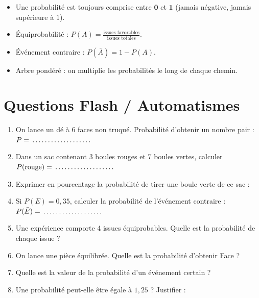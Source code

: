 \begin{cadreretenu}
\begin{itemize}[leftmargin=1.5em, itemsep=2pt]
    \item Une probabilité est toujours comprise entre $\mathbf{0}$ et $\mathbf{1}$ (jamais négative, jamais supérieure à $1$).
    \item Équiprobabilité : $P(A) = \frac{\text{issues favorables}}{\text{issues totales}}$.
    \item Événement contraire : $P(\bar{A}) = 1 - P(A)$.
    \item Arbre pondéré : on multiplie les probabilités le long de chaque chemin.
\end{itemize}
\end{cadreretenu}

\newpage

\section{Questions Flash / Automatismes}

\begin{automatisme}
\begin{enumerate}[label=\textbf{Q\arabic*.}]
    \item On lance un dé à 6 faces non truqué. Probabilité d'obtenir un nombre pair : $P = \pointille[3cm]$
    \item Dans un sac contenant 3 boules rouges et 7 boules vertes, calculer $P(\text{rouge}) = \pointille[3cm]$
    \item Exprimer en pourcentage la probabilité de tirer une boule verte de ce sac : \pointille[3cm]
    \item Si $P(E) = 0{,}35$, calculer la probabilité de l'événement contraire : $P(\bar{E}) = \pointille[3cm]$
    \item Une expérience comporte 4 issues équiprobables. Quelle est la probabilité de chaque issue ? \pointille[3cm]
    \item On lance une pièce équilibrée. Quelle est la probabilité d'obtenir Face ? \pointille[3cm]
    \item Quelle est la valeur de la probabilité d'un événement certain ? \pointille[3cm]
    \item Une probabilité peut-elle être égale à $1{,}25$ ? Justifier : \pointille[3cm]
\end{enumerate}
\end{automatisme}

